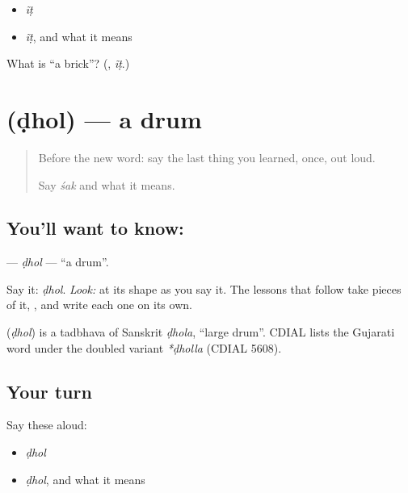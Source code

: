 \begin{itemize}
\raggedright
  \item \emph{ĩṭ}
  \item \emph{ĩṭ}, and what it means
\end{itemize}

\begin{tcolorbox}[breakable,colback=teal!4,colframe=teal!35!black,title={Before you move on}]
What is \textquotedblleft{}a brick\textquotedblright{}? (\textbf{}, \emph{ĩṭ}.)
\end{tcolorbox}
\section[\texorpdfstring{\gu{ઢોલ} (ḍhol)}{ઢોલ (ḍhol)}]{ (ḍhol) — a drum}

\label{lesson:GU-C07-dhol}



\begin{quote}
Before the new word: say the last thing you learned, once, out loud.

Say \emph{śak} and what it means.
\end{quote}

\subsection*{You'll want to know: }
\textbf{} — \emph{ḍhol} — \textquotedblleft{}a drum\textquotedblright{}.

Say it: \emph{ḍhol}. \emph{Look:} at its shape as you say it. The lessons that follow take pieces of it, \textbf{}, and write each one on its own.

\begin{cousinweb}
\textbf{} (\emph{ḍhol}) is a tadbhava of Sanskrit \emph{ḍhola}, \textquotedblleft{}large drum\textquotedblright{}. CDIAL lists the Gujarati word under the doubled variant \emph{*ḍholla} (CDIAL 5608).
\end{cousinweb}

\subsection*{Your turn}
Say these aloud:

\begin{itemize}
\raggedright
  \item \emph{ḍhol}
  \item \emph{ḍhol}, and what it means
\end{itemize}

